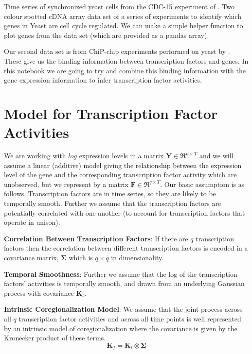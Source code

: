 Time series of synchronized yeast cells from the CDC-15 experiment of \cite{Spellman:1998}. 
Two colour spotted cDNA array data set of a series of experiments to identify which genes in Yeast are 
cell cycle regulated.
We can make a simple helper function to plot genes from the data set (which are provided as a pandas array).

Our second data set is from ChiP-chip experiments performed on yeast by \cite{Lee:2002}. 
These give us the binding information between transcription factors and genes. 
In this notebook we are going to try and combine this binding information with 
the gene expression information to infer transcription factor activities.

\section{Model for Transcription Factor Activities}\label{sec:Model_for_TFA}

We are working with $log$ expression levels in a matrix $\mathbf{Y} \in \Re^{n\times T}$ and 
we will assume a linear (additive) model giving the relationship between the expression level 
of the gene and the corresponding transcription factor activity which are unobserved, but we 
represent by a matrix $\mathbf{F} \in \Re^{q\times T}$. Our basic assumption is as follows. 
Transcription factors are in time series, so they are likely to be temporally smooth. 
Further we assume that the transcription factors are potentially correlated with one another 
(to account for transcription factors that operate in unison). 

\textbf{Correlation Between Transcription Factors}:  
If there are $q$ transcription factors then the correlation between different transcription factors is 
encoded in a covariance matrix, $\boldsymbol{\Sigma}$ which is $q\times q$ in dimensionality. 

\textbf{Temporal Smoothness}: 
Further we assume that the log of the transcription factors' activities is temporally smooth, 
and drawn from an underlying Gaussian process with covariance $\mathbf{K}_t$. 

\textbf{Intrinsic Coregionalization Model}: 
We assume that the joint process across all $q$ transcription factor activities and across all time points 
is well represented by an intrinsic model of coregionalization where the covariance is given by the 
Kronecker product of these terms.
\begin{equation} \label{eq:K_intrinsic_coregionalization}
  \mathbf{K}_f = \mathbf{K}_t \otimes \boldsymbol{\Sigma}
\end{equation}

